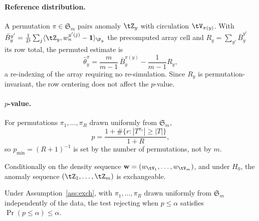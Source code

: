 \paragraph{Reference distribution.}
A permutation $\pi \in \mathfrak S_m$ pairs anomaly $\tZ_y$ with circulation
$\tV_{\pi(y)}$. With
$\bar B_y^{y'} = \frac1D\sum_j \langle \tZ_y, w_n^{y'(j)} - \mathbf 1\rangle_{\P_y}$
the precomputed array cell and $R_y = \sum_{y'} \bar B_y^{y'}$ its row total, the
permuted estimate is
\begin{equation}
  \label{eq:permstat}
  \hat\theta_y^{\pi}
  = \frac{m}{m-1}\,\bar B_y^{\pi(y)} - \frac{1}{m-1}R_y,
\end{equation}
a re-indexing of the array requiring no re-simulation. Since $R_y$ is
permutation-invariant, the row centering does not affect the $p$-value.

\paragraph{$p$-value.}
For permutations $\pi_1,\ldots,\pi_R$ drawn uniformly from $\mathfrak S_m$,
\begin{equation}
  \label{eq:pval}
  p = \frac{1 + \#\{r: |T^{\pi_r}| \ge |T|\}}{1 + R},
\end{equation}
so $p_{\min} = (R+1)^{-1}$ is set by the number of permutations, not by $m$.

\begin{assumption}
\label{ass:exch}
Conditionally on the density sequence $\mathbf w = (w_{\tV_1},\ldots,w_{\tV_m})$,
and under $H_0$, the anomaly sequence $(\tZ_1,\ldots,\tZ_m)$ is exchangeable.
\end{assumption}

\begin{proposition}[Exactness]
\label{prop:exact}
Under Assumption~\ref{ass:exch}, with $\pi_1,\ldots,\pi_R$ drawn uniformly from
$\mathfrak S_m$ independently of the data, the test rejecting when $p\le\alpha$
satisfies $\Pr(p\le\alpha)\le\alpha$.
\end{proposition}

